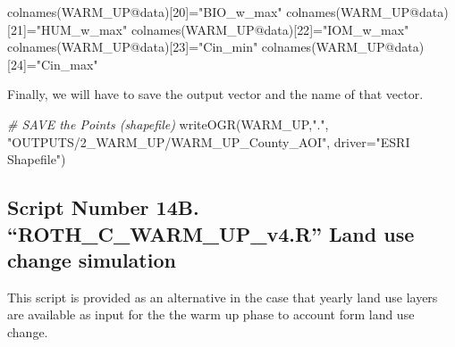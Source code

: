 \documentclass[
  10pt,
  b5paper,
]{book}
\newenvironment{Shaded}{\begin{snugshade}}{\end{snugshade}}
\newcommand{\AttributeTok}[1]{\textcolor[rgb]{0.77,0.63,0.00}{#1}}
\newcommand{\CommentTok}[1]{\textcolor[rgb]{0.56,0.35,0.01}{\textit{#1}}}
\newcommand{\DecValTok}[1]{\textcolor[rgb]{0.00,0.00,0.81}{#1}}
\newcommand{\FunctionTok}[1]{\textcolor[rgb]{0.00,0.00,0.00}{#1}}
\newcommand{\NormalTok}[1]{#1}
\newcommand{\OtherTok}[1]{\textcolor[rgb]{0.56,0.35,0.01}{#1}}
\newcommand{\SpecialCharTok}[1]{\textcolor[rgb]{0.00,0.00,0.00}{#1}}
\newcommand{\StringTok}[1]{\textcolor[rgb]{0.31,0.60,0.02}{#1}}
\begin{document}
\begin{Shaded}
\begin{Highlighting}[]
\FunctionTok{colnames}\NormalTok{(WARM\_UP}\SpecialCharTok{@}\NormalTok{data)[}\DecValTok{20}\NormalTok{]}\OtherTok{=}\StringTok{"BIO\_w\_max"}
\FunctionTok{colnames}\NormalTok{(WARM\_UP}\SpecialCharTok{@}\NormalTok{data)[}\DecValTok{21}\NormalTok{]}\OtherTok{=}\StringTok{"HUM\_w\_max"}
\FunctionTok{colnames}\NormalTok{(WARM\_UP}\SpecialCharTok{@}\NormalTok{data)[}\DecValTok{22}\NormalTok{]}\OtherTok{=}\StringTok{"IOM\_w\_max"}
\FunctionTok{colnames}\NormalTok{(WARM\_UP}\SpecialCharTok{@}\NormalTok{data)[}\DecValTok{23}\NormalTok{]}\OtherTok{=}\StringTok{"Cin\_min"}
\FunctionTok{colnames}\NormalTok{(WARM\_UP}\SpecialCharTok{@}\NormalTok{data)[}\DecValTok{24}\NormalTok{]}\OtherTok{=}\StringTok{"Cin\_max"}
\end{Highlighting}
\end{Shaded}

Finally, we will have to save the output vector and the name of that vector.

\begin{Shaded}
\begin{Highlighting}[]
 \CommentTok{\# SAVE the Points (shapefile) }
\FunctionTok{writeOGR}\NormalTok{(WARM\_UP,}\StringTok{"."}\NormalTok{, }\StringTok{"OUTPUTS/2\_WARM\_UP/WARM\_UP\_County\_AOI"}\NormalTok{, }\AttributeTok{driver=}\StringTok{"ESRI Shapefile"}\NormalTok{)}
\end{Highlighting}
\end{Shaded}

\hypertarget{script-number-14b.-roth_c_warm_up_v4.r-land-use-change-simulation}{%
\subsection{Script Number 14B. ``ROTH\_C\_WARM\_UP\_v4.R'' Land use change simulation}\label{script-number-14b.-roth_c_warm_up_v4.r-land-use-change-simulation}}

This script is provided as an alternative in the case that yearly land use layers are available as input for the the warm up phase to account form land use change.
\end{document}
